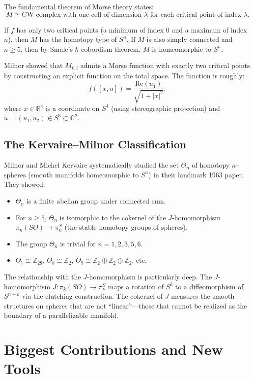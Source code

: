 The fundamental theorem of Morse theory states:
\[
M \simeq \text{CW-complex with one cell of dimension $\lambda$ for each critical point of index $\lambda$}.
\]

If $f$ has only two critical points (a minimum of index 0 and a maximum of index $n$), then $M$ has the homotopy type of $S^n$. If $M$ is also simply connected and $n \geq 5$, then by Smale's $h$-cobordism theorem, $M$ is homeomorphic to $S^n$.

Milnor showed that $M_{k,l}$ admits a Morse function with exactly two critical points by constructing an explicit function on the total space. The function is roughly:
\[
f([x,u]) = \frac{\text{Re}(u_1)}{\sqrt{1 + |x|^2}},
\]
where $x \in \mathbb{R}^4$ is a coordinate on $S^4$ (using stereographic projection) and $u = (u_1, u_2) \in S^3 \subset \mathbb{C}^2$.

\subsection{The Kervaire--Milnor Classification}

Milnor and Michel Kervaire systematically studied the set $\Theta_n$ of homotopy $n$-spheres (smooth manifolds homeomorphic to $S^n$) in their landmark 1963 paper. They showed:
\begin{itemize}
\item $\Theta_n$ is a finite abelian group under connected sum.
\item For $n \geq 5$, $\Theta_n$ is isomorphic to the cokernel of the $J$-homomorphism $\pi_n(SO) \to \pi_n^S$ (the stable homotopy groups of spheres).
\item The group $\Theta_n$ is trivial for $n = 1,2,3,5,6$.
\item $\Theta_7 \cong \mathbb{Z}_{28}$, $\Theta_8 \cong \mathbb{Z}_2$, $\Theta_9 \cong \mathbb{Z}_2 \oplus \mathbb{Z}_2 \oplus \mathbb{Z}_2$, etc.
\end{itemize}

The relationship with the $J$-homomorphism is particularly deep. The $J$-homomorphism $J: \pi_k(SO) \to \pi_{k}^S$ maps a rotation of $S^k$ to a diffeomorphism of $S^{n+k}$ via the clutching construction. The cokernel of $J$ measures the smooth structures on spheres that are not ``linear''---those that cannot be realized as the boundary of a parallelizable manifold.

\section{Biggest Contributions and New Tools}

